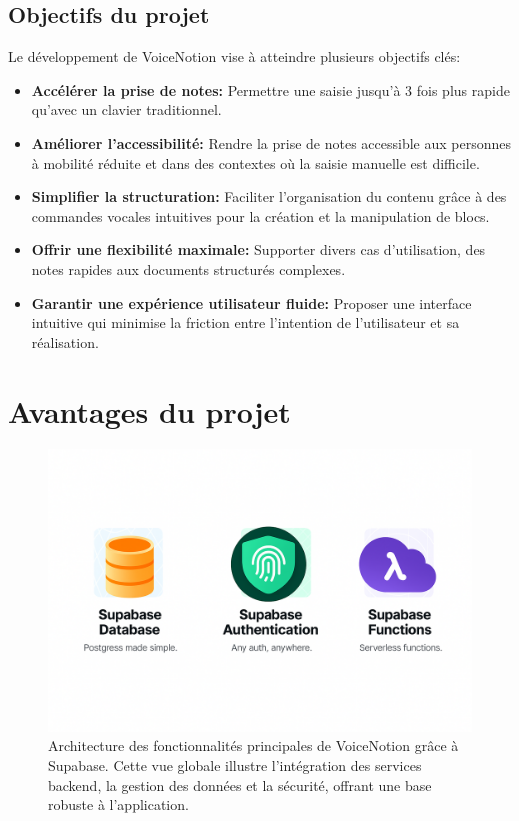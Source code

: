 \subsection{Objectifs du projet}

Le développement de VoiceNotion vise à atteindre plusieurs objectifs clés:

\begin{itemize}
    \item \textbf{Accélérer la prise de notes:} Permettre une saisie jusqu'à 3 fois plus rapide qu'avec un clavier traditionnel.
    
    \item \textbf{Améliorer l'accessibilité:} Rendre la prise de notes accessible aux personnes à mobilité réduite et dans des contextes où la saisie manuelle est difficile.
    
    \item \textbf{Simplifier la structuration:} Faciliter l'organisation du contenu grâce à des commandes vocales intuitives pour la création et la manipulation de blocs.
    
    \item \textbf{Offrir une flexibilité maximale:} Supporter divers cas d'utilisation, des notes rapides aux documents structurés complexes.
    
    \item \textbf{Garantir une expérience utilisateur fluide:} Proposer une interface intuitive qui minimise la friction entre l'intention de l'utilisateur et sa réalisation.
\end{itemize}

\section{Avantages du projet}

\begin{figure}[H]
    \centering
    \includegraphics[width=\textwidth]{assets/docs/golobal-diagrams/supabase-feaature.png}
    \caption{Architecture des fonctionnalités principales de VoiceNotion grâce à Supabase. Cette vue globale illustre l'intégration des services backend, la gestion des données et la sécurité, offrant une base robuste à l'application.}
\end{figure}


